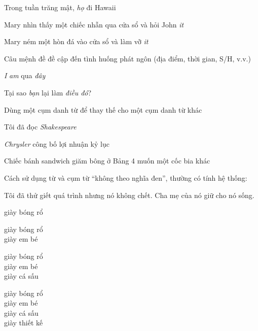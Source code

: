\documentclass{article}
\begin{document}
\begin{huge}
Trong tuần trăng mật, \emph{họ} đi Hawaii

Mary nhìn thấy một chiếc nhẫn qua cửa sổ và hỏi John \emph{it}

Mary ném một hòn đá vào cửa sổ và làm vỡ \emph{it}



Câu mệnh đề đề cập đến tình huống phát ngôn (địa điểm, thời gian, S/H, v.v.)

\emph{I} \emph{am} qua \emph{đây}

Tại sao \emph{bạn} lại làm \emph{điều đó}?



Dùng một cụm danh từ để thay thế cho một cụm danh từ khác

Tôi đã đọc \emph{Shakespeare}

\emph{Chrysler} công bố lợi nhuận kỷ lục

Chiếc bánh sandwich giăm bông \emph{} ở Bảng 4 muốn một cốc bia khác



Cách sử dụng từ và cụm từ “không theo nghĩa đen”, thường có tính hệ thống:

Tôi đã thử giết quá trình nhưng nó không chết. Cha mẹ của nó giữ cho nó sống.



giày bóng rổ


giày bóng rổ\\
giày em bé


giày bóng rổ\\
giày em bé\\
giày cá sấu


giày bóng rổ\\
giày em bé\\
giày cá sấu \\
giày thiết kế


\end{huge}
\end{document}
